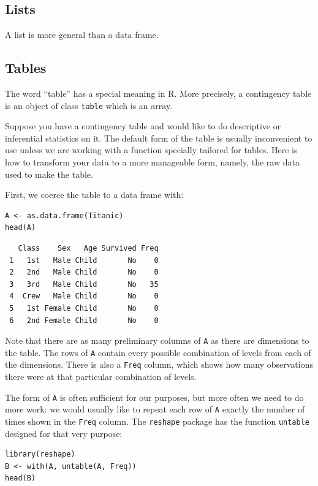 \documentclass[captions=tableheading]{scrbook}
\begin{document}
\subsection{Lists}
\label{sec-20-1-4}

A list is more general than a data frame.
\subsection{Tables}
\label{sec-20-1-5}

The word ``table'' has a special meaning in \textsf{R}. More precisely, a contingency table is an object of class \texttt{table} which is an array.

Suppose you have a contingency table and would like to do descriptive or inferential statistics on it. The default form of the table is usually inconvenient to use unless we are working with a function specially tailored for tables. Here is how to transform your data to a more manageable form, namely, the raw data used to make the table.

First, we coerce the table to a data frame with: 


\begin{verbatim}
A <- as.data.frame(Titanic)
head(A)
\end{verbatim}

\begin{verbatim}
   Class    Sex   Age Survived Freq
 1   1st   Male Child       No    0
 2   2nd   Male Child       No    0
 3   3rd   Male Child       No   35
 4  Crew   Male Child       No    0
 5   1st Female Child       No    0
 6   2nd Female Child       No    0
\end{verbatim}

Note that there are as many preliminary columns of \texttt{A} as there are dimensions to the table. The rows of \texttt{A} contain every possible combination of levels from each of the dimensions. There is also a \texttt{Freq} column, which shows how many observations there were at that particular combination of levels. 

The form of \texttt{A} is often sufficient for our purposes, but more often we need to do more work: we would usually like to repeat each row of \texttt{A} exactly the number of times shown in the \texttt{Freq} column. The \texttt{reshape} package \cite{Wickhamreshape} has the function \texttt{untable} designed for that very purpose: 


\begin{verbatim}
library(reshape)
B <- with(A, untable(A, Freq))
head(B)
\end{verbatim}
\end{document}
